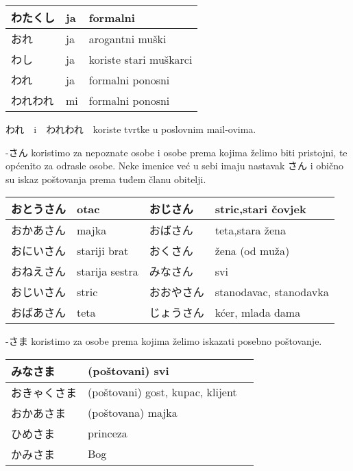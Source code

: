 	
	\vspace{10pt}
	
	\begin{tabular}{|l|l|l|}
		\hline
		わたくし&ja&formalni\\\hline
		おれ&ja&arogantni muški\\\hline
		わし&ja&koriste stari muškarci\\\hline
		われ&ja&formalni ponosni\\\hline
		われわれ&mi&formalni ponosni\\\hline
	\end{tabular}

	\vspace{10pt}	
	
	われ　i　われわれ　koriste tvrtke u poslovnim mail-ovima.
	
	

	\vspace{10pt}

	-さん	koristimo za nepoznate osobe i osobe prema kojima želimo biti pristojni, te općenito za odrasle osobe. Neke imenice već u sebi imaju nastavak さん i obično su iskaz poštovanja prema tuđem članu obitelji.
	
	\vspace{10pt}	
	
	\begin{tabular}{|l|l||l||l|}
		\hline
		おとうさん&otac&おじさん&stric,stari čovjek\\\hline
		おかあさん&majka&おばさん&teta,stara žena\\\hline
		おにいさん&stariji brat&おくさん&žena (od muža)\\\hline
		おねえさん&starija sestra&みなさん&svi\\\hline
		おじいさん&stric&おおやさん&stanodavac, stanodavka\\\hline
		おばあさん&teta&じょうさん&kćer, mlada dama\\\hline
	\end{tabular}
	
	\vspace{10pt}
	
	
	-さま koristimo za osobe prema kojima želimo iskazati posebno poštovanje.
	
	\vspace{10pt}
	
	\begin{tabular}{|l|l|l|}
		\hline
		みなさま&(poštovani) svi\\\hline
		おきゃくさま&(poštovani) gost, kupac, klijent\\\hline
		おかあさま&(poštovana) majka\\\hline
		ひめさま&princeza\\\hline
		かみさま&Bog\\\hline
	\end{tabular}
	

